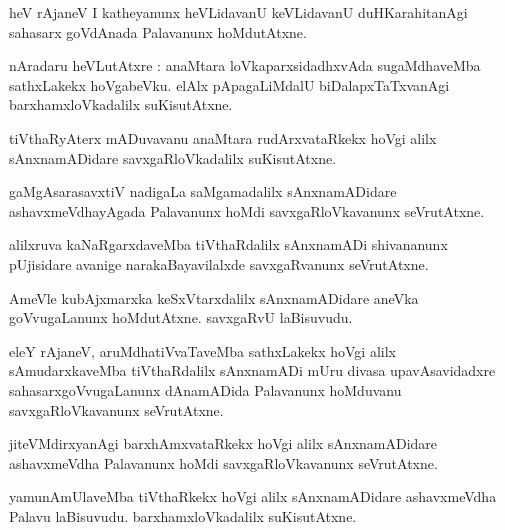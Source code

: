\documentclass{article}
\begin{document}
\begin{mn}
heV rAjaneV I katheyanunx heVLidavanU keVLidavanU duHKarahitanAgi sahasarx goVdAnada Palavanunx 
hoMdutAtxne.
\end{mn}


\begin{mn}
nAradaru heVLutAtxre : anaMtara loVkaparxsidadhxvAda sugaMdhaveMba sathxLakekx hoVgabeVku. 
elAlx pApagaLiMdalU biDalapxTaTxvanAgi barxhamxloVkadalilx suKisutAtxne.
\end{mn}

\begin{mn}
tiVthaRyAterx mADuvavanu anaMtara rudArxvataRkekx hoVgi alilx sAnxnamADidare savxgaRloVkadalilx 
suKisutAtxne.
\end{mn}

\begin{mn}
gaMgAsarasavxtiV nadigaLa saMgamadalilx sAnxnamADidare ashavxmeVdhayAgada Palavanunx hoMdi 
savxgaRloVkavanunx seVrutAtxne.
\end{mn}

\begin{mn}
alilxruva kaNaRgarxdaveMba tiVthaRdalilx sAnxnamADi shivananunx pUjisidare avanige 
narakaBayavilalxde savxgaRvanunx seVrutAtxne.
\end{mn}

\begin{mn}
AmeVle kubAjxmarxka keSxVtarxdalilx sAnxnamADidare aneVka goVvugaLanunx hoMdutAtxne. savxgaRvU 
laBisuvudu.
\end{mn}

\begin{mn}
eleY rAjaneV, aruMdhatiVvaTaveMba sathxLakekx hoVgi alilx sAmudarxkaveMba tiVthaRdalilx sAnxnamADi 
mUru divasa upavAsavidadxre sahasarxgoVvugaLanunx dAnamADida Palavanunx hoMduvanu 
savxgaRloVkavanunx seVrutAtxne.
\end{mn}

\begin{mn}
jiteVMdirxyanAgi barxhAmxvataRkekx hoVgi alilx sAnxnamADidare ashavxmeVdha Palavanunx 
hoMdi savxgaRloVkavanunx seVrutAtxne.
\end{mn}

\begin{mn}
yamunAmUlaveMba tiVthaRkekx hoVgi alilx sAnxnamADidare ashavxmeVdha Palavu  laBisuvudu. 
barxhamxloVkadalilx suKisutAtxne.
\end{mn}
\end{document}
